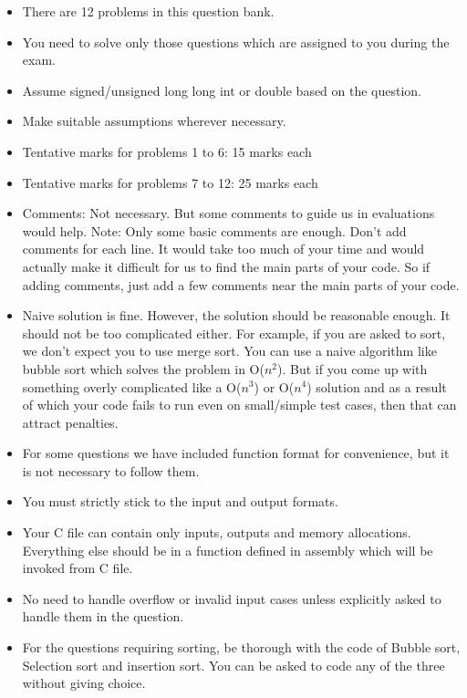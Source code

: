 \documentclass[a4paper,11pt]{article} %
\begin{document}
\begin{itemize}
    \item There are 12 problems in this question bank.
    \item You need to solve only those questions which are assigned to you during the exam.
    \item Assume signed/unsigned long long int or double based on the question.
    \item Make suitable assumptions wherever necessary.
    \item Tentative marks for problems 1 to 6: 15 marks each
    \item Tentative marks for problems 7 to 12: 25 marks each
    \item Comments: Not necessary. But some comments to guide us in evaluations would help. Note: Only some basic comments are enough. Don't add comments for each line. It would take too much of your time and would actually make it difficult for us to find the main parts of your code. So if adding comments, just add a few comments near the main parts of your code.
    \item Naive solution is fine. However, the solution should be reasonable enough. It should not be too complicated either. For example, if you are asked to sort, we don't expect you to use merge sort. You can use a naive algorithm like bubble sort which solves the problem in O($n^2$). But if you come up with something overly complicated like a O($n^{3}$) or O($n^4$) solution and as a result of which your code fails to run even on small/simple test cases, then that can attract penalties.
    \item For some questions we have included function format for convenience, but it is not necessary to follow them.
    \item You must strictly stick to the input and output formats.
    \item  Your C file can contain only inputs, outputs and memory allocations. Everything else should be in a function defined in assembly which will be invoked from C file.
    \item No need to handle overflow or invalid input cases unless explicitly asked to handle them in the question.
    \item For the questions requiring sorting, be thorough with the code of Bubble sort, Selection sort and insertion sort. You can be asked to code any of the three without giving choice.


\end{itemize}
\end{document}
